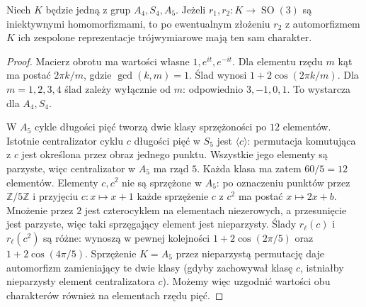 \begin{lemat}
\label{aa:lem:binary-rotation-character}
Niech $K$ będzie jedną z grup $A_4,S_4,A_5$.
Jeżeli $r_1,r_2:K\to\operatorname{SO}(3)$ są iniektywnymi
homomorfizmami, to po ewentualnym złożeniu $r_2$
z automorfizmem $K$ ich zespolone reprezentacje
trójwymiarowe mają ten sam charakter.
\end{lemat}
\begin{proof}
Macierz obrotu ma wartości własne $1,e^{it},e^{-it}$.
Dla elementu rzędu $m$ kąt ma postać $2\pi k/m$,
gdzie $\gcd(k,m)=1$. Ślad wynosi $1+2\cos(2\pi k/m)$.
Dla $m=1,2,3,4$ ślad zależy wyłącznie od $m$:
odpowiednio $3,-1,0,1$. To wystarcza dla $A_4,S_4$.

W $A_5$ cykle długości pięć tworzą dwie klasy
sprzężoności po $12$ elementów. Istotnie centralizator
cyklu $c$ długości pięć w $S_5$ jest $\langle c\rangle$:
permutacja komutująca z $c$ jest określona przez obraz
jednego punktu. Wszystkie jego elementy są parzyste,
więc centralizator w $A_5$ ma rząd $5$.
Każda klasa ma zatem $60/5=12$ elementów.
Elementy $c,c^2$ nie są sprzężone w $A_5$:
po oznaczeniu punktów przez $\mathbb Z/5\mathbb Z$
i przyjęciu $c:x\mapsto x+1$ każde sprzężenie $c$ z $c^2$
ma postać $x\mapsto 2x+b$. Mnożenie przez $2$
jest czterocyklem na elementach niezerowych,
a przesunięcie jest parzyste, więc taki sprzęgający
element jest nieparzysty.
Ślady $r_\ell(c)$ i $r_\ell(c^2)$ są różne:
wynoszą w pewnej kolejności
$1+2\cos(2\pi/5)$ oraz $1+2\cos(4\pi/5)$.
Sprzężenie $K=A_5$ przez nieparzystą permutację
daje automorfizm zamieniający te dwie klasy
(gdyby zachowywał klasę $c$, istniałby nieparzysty
element centralizatora $c$).
Możemy więc uzgodnić wartości obu charakterów
również na elementach rzędu pięć.
\end{proof}

